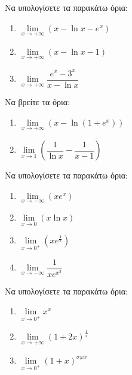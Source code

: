 \documentclass{presentation}
\begin{document}
\begin{askisi}
  Να υπολογίσετε τα παρακάτω όρια:
  \begin{enumerate}
    \item<1-> $\lim\limits_{x \to +\infty}{ (x-\ln x-e^x) }$
    \item<2-> $\lim\limits_{x \to +\infty}{ (x-\ln x-1) }$
    \item<3-> $\lim\limits_{x \to +\infty}{ \dfrac{e^x-3^x}{x-\ln x} }$
  \end{enumerate}

\end{askisi}

\begin{askisi}
  Να βρείτε τα όρια:
  \begin{enumerate}
    \item<1-> $\lim\limits_{x \to +\infty}{ (x-\ln (1+e^x)) }$
    \item<2-> $\lim\limits_{x \to 1}{ \left( \dfrac{1}{\ln x} - \dfrac{1}{x-1} \right)  }$
  \end{enumerate}

\end{askisi}

\begin{askisi}
  Να υπολογίσετε τα παρακάτω όρια:
  \begin{enumerate}
    \item<1-> $\lim\limits_{x \to -\infty}{ (xe^x) }$
    \item<2-> $\lim\limits_{x \to 0}{ (x\ln x) }$
    \item<3-> $\lim\limits_{x \to 0^+}{ \left( xe^{\frac{1}{x}} \right)  }$
    \item<4-> $\lim\limits_{x \to -\infty}{ \dfrac{1}{xe^{x^3}} }$
  \end{enumerate}

\end{askisi}

\begin{askisi}
  Να υπολογίσετε τα παρακάτω όρια:
  \begin{enumerate}[<+->]
    \item $\lim\limits_{x \to 0^+}{ x^x }$
    \item $\lim\limits_{x \to +\infty}{ \left( 1+2x \right)^{\frac{1}{x}}  }$
    \item $\lim\limits_{x \to 0^+}{ \left( 1+x \right)^{σφx}  }$
  \end{enumerate}
\end{askisi}
\end{document}
